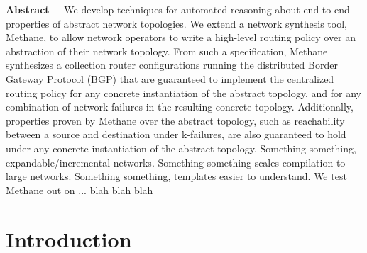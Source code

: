 \documentclass{sig-alternate-10pt}
\newcommand{\sysname}{{\small \sf Methane}\xspace}
\begin{document}
\textbf{Abstract---}
We develop techniques for automated reasoning about end-to-end properties of abstract network topologies. We extend a network synthesis tool, \sysname, to allow network operators to write a high-level routing policy over an abstraction of their network topology. From such a specification, \sysname synthesizes a collection router configurations running the distributed Border Gateway Protocol (BGP) that are guaranteed to implement the centralized routing policy for any concrete instantiation of the abstract topology, and for any combination of network failures in the resulting concrete topology.
%
Additionally, properties proven by \sysname over the abstract topology, such as reachability between a source and destination under k-failures, are also guaranteed to hold under any concrete instantiation of the abstract topology.
%
Something something, expandable/incremental networks. Something something scales compilation to large networks. Something something, templates easier to understand.
%
%
We test \sysname out on ... blah blah blah



%
%
%
%




%
%
%
%

\section{Introduction}
\label{sec:introduction}
\end{document}
